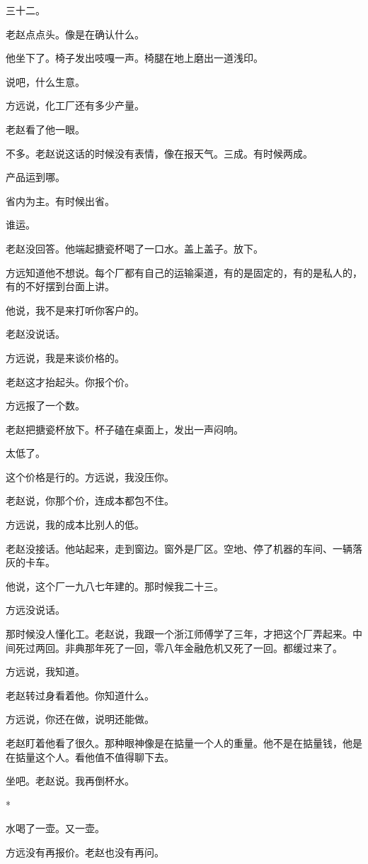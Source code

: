 \documentclass[UTF8,a5paper,11pt,openany]{ctexbook}
\newcommand{\scene}{\vspace{1em}\begin{center}*\quad*\quad*\end{center}\vspace{0.5em}}
\begin{document}
三十二。

老赵点点头。像是在确认什么。

他坐下了。椅子发出吱嘎一声。椅腿在地上磨出一道浅印。

说吧，什么生意。

方远说，化工厂还有多少产量。

老赵看了他一眼。

不多。老赵说这话的时候没有表情，像在报天气。三成。有时候两成。

产品运到哪。

省内为主。有时候出省。

谁运。

老赵没回答。他端起搪瓷杯喝了一口水。盖上盖子。放下。

方远知道他不想说。每个厂都有自己的运输渠道，有的是固定的，有的是私人的，有的不好摆到台面上讲。

他说，我不是来打听你客户的。

老赵没说话。

方远说，我是来谈价格的。

老赵这才抬起头。你报个价。

方远报了一个数。

老赵把搪瓷杯放下。杯子磕在桌面上，发出一声闷响。

太低了。

这个价格是行的。方远说，我没压你。

老赵说，你那个价，连成本都包不住。

方远说，我的成本比别人的低。

老赵没接话。他站起来，走到窗边。窗外是厂区。空地、停了机器的车间、一辆落灰的卡车。

他说，这个厂一九八七年建的。那时候我二十三。

方远没说话。

那时候没人懂化工。老赵说，我跟一个浙江师傅学了三年，才把这个厂弄起来。中间死过两回。非典那年死了一回，零八年金融危机又死了一回。都缓过来了。

方远说，我知道。

老赵转过身看着他。你知道什么。

方远说，你还在做，说明还能做。

老赵盯着他看了很久。那种眼神像是在掂量一个人的重量。他不是在掂量钱，他是在掂量这个人。看他值不值得聊下去。

坐吧。老赵说。我再倒杯水。


\scene

水喝了一壶。又一壶。

方远没有再报价。老赵也没有再问。
\end{document}
